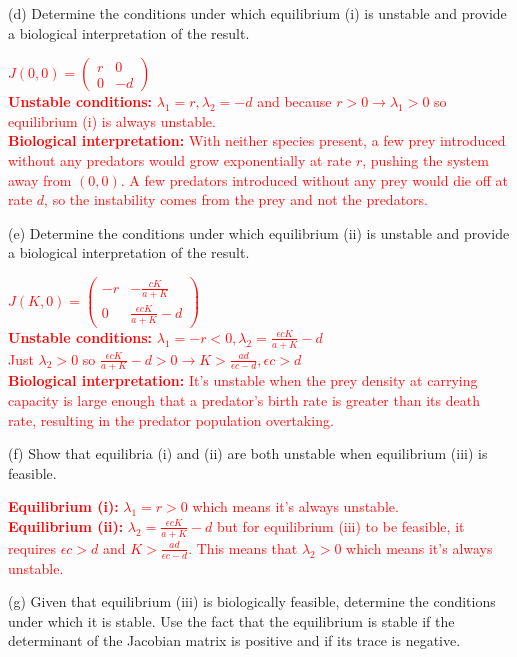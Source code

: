\documentclass[11pt]{article}
\begin{document}
(d) Determine the conditions under which equilibrium (i) is unstable and provide a biological interpretation of the result. 

\textcolor{red}{
$J(0, 0) = \begin{pmatrix} r & 0 \\ 0 & -d \end{pmatrix}$\\
\textbf{Unstable conditions:} $\lambda_1 = r, \lambda_2 = -d$ and because $r > 0 \rightarrow \lambda_1 > 0$ so equilibrium (i) is always unstable.\\
\textbf{Biological interpretation:} With neither species present, a few prey introduced without any predators would grow exponentially at rate $r$, pushing the system away from $(0,0)$. A few predators introduced without any prey would die off at rate $d$, so the instability comes from the prey and not the predators.
}

(e) Determine the conditions under which equilibrium (ii) is unstable and provide a biological interpretation of the result. 

\textcolor{red}{
$J(K, 0) = \begin{pmatrix} -r & -\frac{cK}{a+K} \\ 0 & \frac{\epsilon c K}{a+K} - d \end{pmatrix}$\\
\textbf{Unstable conditions:} $\lambda_1 = -r < 0, \lambda_2 = \frac{\epsilon c K}{a+K} - d$\\
Just $\lambda_2 > 0$ so $\frac{\epsilon c K}{a+K} - d > 0 \rightarrow K > \frac{ad}{\epsilon c - d}, \epsilon c > d$\\
\textbf{Biological interpretation:} It's unstable when the prey density at carrying capacity is large enough that a predator's birth rate is greater than its death rate, resulting in the predator population overtaking.
}

(f) Show that equilibria (i) and (ii) are both unstable when equilibrium (iii) is feasible. 

\textcolor{red}{
\textbf{Equilibrium (i):} $\lambda_1 = r > 0$ which means it's always unstable.\\
\textbf{Equilibrium (ii):} $\lambda_2 = \frac{\epsilon c K}{a+K} - d$ but for equilibrium (iii) to be feasible, it requires $\epsilon c > d$ and $K > \frac{ad}{\epsilon c - d}$. This means that $\lambda_2 > 0$ which means it's always unstable.
}

(g) Given that equilibrium (iii) is biologically feasible, determine the conditions under which it is stable. Use the fact that the equilibrium is stable if the determinant of the Jacobian matrix is positive and if its trace is negative. 
\end{document}
